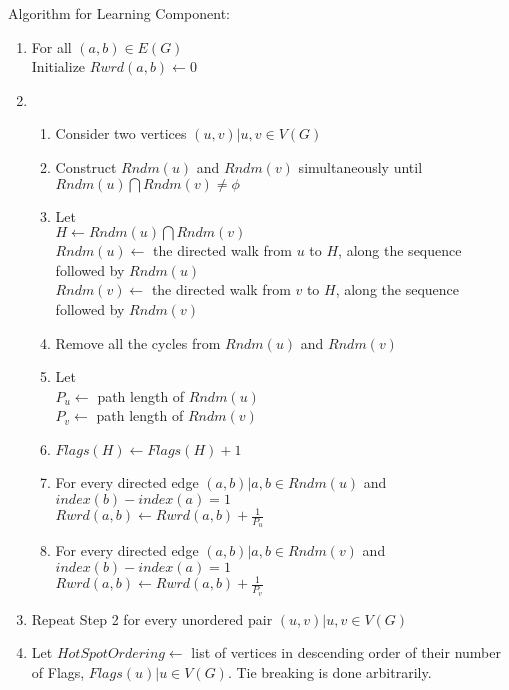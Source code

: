 \documentclass{article}
\begin{document}
Algorithm for Learning Component:
\begin{enumerate}

\item For all $(a,b) \in E(G)$\\
Initialize $Rwrd(a,b) \longleftarrow 0$

\item
\begin{enumerate}

\item Consider two vertices $(u,v) | u,v \in V(G)$

\item Construct $Rndm(u)$ and $Rndm(v)$ simultaneously until\\
$Rndm(u) \bigcap Rndm(v) \ne \phi$

\item Let\\
$H \longleftarrow Rndm(u) \bigcap Rndm(v)$\\
$Rndm(u) \longleftarrow$ the directed walk from $u$ to $H$, along the sequence followed by $Rndm(u)$\\
$Rndm(v) \longleftarrow$ the directed walk from $v$ to $H$, along the sequence followed by $Rndm(v)$

\item Remove all the cycles from $Rndm(u)$ and $Rndm(v)$

\item Let\\
$P_u \longleftarrow$ path length of $Rndm(u)$\\
$P_v \longleftarrow$ path length of $Rndm(v)$

\item $Flags(H) \longleftarrow Flags(H) + 1$

\item For every directed edge $(a,b) | a,b \in Rndm(u)$ and $index(b)-index(a) = 1 $\\
$Rwrd(a,b) \longleftarrow Rwrd(a,b) + \frac{1}{P_u}$

\item For every directed edge $(a,b) | a,b \in Rndm(v)$ and $index(b)-index(a) = 1 $\\
$Rwrd(a,b) \longleftarrow Rwrd(a,b) + \frac{1}{P_v}$

\end{enumerate}

\item Repeat Step 2 for every unordered pair $(u,v) | u,v \in V(G)$
\item Let
$HotSpotOrdering \longleftarrow$ list of vertices in descending order of their number of Flags, $Flags(u) | u \in V(G)$. Tie breaking is done arbitrarily.


\end{enumerate}
\end{document}
